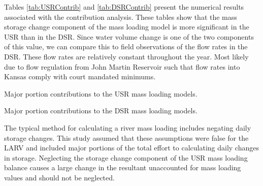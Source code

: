 Tables \ref{tab:USRContrib} and \ref{tab:DSRContrib} present the numerical results associated with the contribution analysis.  These tables show that the mass storage change component of the mass loading model is more significant in the USR than in the DSR.  Since water volume change is one of the two components of this value, we can compare this to field observations of the flow rates in the DSR.  These flow rates are relatively constant throughout the year.  Most likely due to flow regulation from John Martin Reservoir such that flow rates into Kansas comply with court mandated minimums.

\begin{table}[htbp]
	\centering
	\caption[Major portion contributions to the USR mass loading models.]{Major portion contributions to the USR mass loading models.}
	\label{tab:USRContrib}
	
\end{table}
\tablevspace
\begin{table}[htbp]
	\centering
	\caption[Major portion contributions to the DSR mass loading models.]{Major portion contributions to the DSR mass loading models.}
	\label{tab:DSRContrib}
	
\end{table}

The typical method for calculating a river mass loading includes negating daily storage changes.  This study assumed that these assumptions were false for the LARV and included major portions of the total effort to calculating daily changes in storage.  Neglecting the storage change component of the USR mass loading balance causes a large change in the resultant unaccounted for mass loading values and should not be neglected.

\clearpage{}